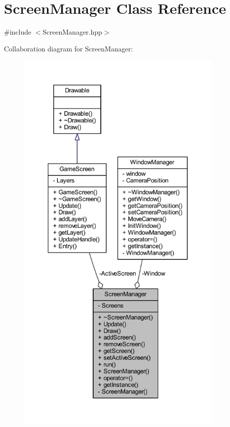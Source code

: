 \hypertarget{class_screen_manager}{\section{Screen\-Manager Class Reference}
\label{class_screen_manager}
}


{\ttfamily \#include $<$Screen\-Manager.\-hpp$>$}



Collaboration diagram for Screen\-Manager\-:\nopagebreak
\begin{figure}[H]
\begin{center}
\leavevmode
\includegraphics[height=550pt]{class_screen_manager__coll__graph}
\end{center}
\end{figure}
